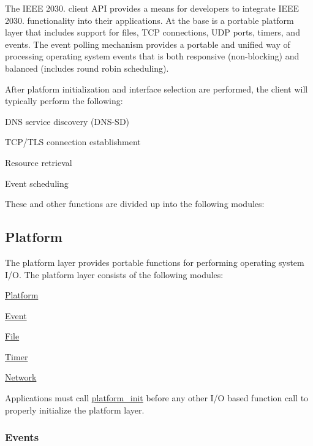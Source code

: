 The I\+E\+EE 2030. client A\+PI provides a means for developers to integrate I\+E\+EE 2030. functionality into their applications. At the base is a portable platform layer that includes support for files, T\+CP connections, U\+DP ports, timers, and events. The event polling mechanism provides a portable and unified way of processing operating system events that is both responsive (non-\/blocking) and balanced (includes round robin scheduling).

After platform initialization and interface selection are performed, the client will typically perform the following\+:


\begin{DoxyItemize}
\item D\+NS service discovery (D\+N\+S-\/\+SD)
\item T\+C\+P/\+T\+LS connection establishment
\item Resource retrieval
\item Event scheduling
\end{DoxyItemize}

These and other functions are divided up into the following modules\+:

\subsection*{Platform }

The platform layer provides portable functions for performing operating system I/O. The platform layer consists of the following modules\+:


\begin{DoxyItemize}
\item \hyperlink{group__platform}{Platform}
\begin{DoxyItemize}
\item \hyperlink{group__event}{Event}
\item \hyperlink{group__file}{File}
\item \hyperlink{group__timer}{Timer}
\item \hyperlink{group__network}{Network}
\end{DoxyItemize}
\end{DoxyItemize}

Applications must call \hyperlink{group__platform_ga390c450e83ddc7807da2e9f0a894d8d1}{platform\+\_\+init} before any other I/O based function call to properly initialize the platform layer.

\subsubsection*{Events}

